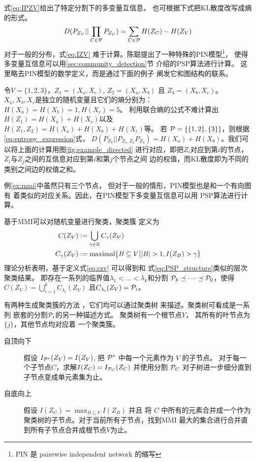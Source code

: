 式\eqref{eq:IPZV}给出了特定分割下的多变量互信息，
也可根据下式把KL散度改写成熵的形式。
\begin{equation}\label{eq:entropy_expression}
  D(P_{Z_V} || \prod_{C\in \P} P_{Z_C}) 
  = \sum_{C \in \P}
  H(Z_C) - H(Z_V)
\end{equation}
对于一般的分布，式\ref{eq:IZV}
难于计算。陈聪提出了一种特殊的PIN模型\cite{pin}\footnote{PIN 是 pairewise independent network
的缩写}，
使得多变量互信息可以用\ref{sec:community_detection}节
介绍的PSP算法进行计算。
这里略去PIN模型的数学定义，而是通过下面的例子
阐发它和图结构的联系。
\begin{example}\label{ex:mmi}
  令$V=\{1,2,3\}$，$Z_1=(X_a, X_c)$,
  $Z_2=(X_a,X_b)$ 且 $Z_3=(X_b,X_c)$。
  $X_a,X_b,X_c$是独立的随机变量且它们的熵分别为：
  $H(X_a)=H(X_b)=1, H(X_c)=5$。
  利用联合熵的公式不难计算出$H(Z_1)=H(X_a)+H(X_c)$以及
  $H(Z_1, Z_2) = H(X_a) + H(X_b) + H(X_c)$等。
  若 $\P=\{\{1,2\}, \{3\}\}$，则根据
  \eqref{eq:entropy_expression}式，
  $D(P_{Z_V}||P_{Z_1,Z_2}P_{Z_3}) = H(X_a)
  +H(X_b)$。我们可以将上面的计算用图\ref{fig:example_directed}
  进行对应，即把$Z_i$对应到第$i$的节点，
  $Z_i$与$Z_j$之间的互信息对应到第$i$和第$j$个节点之间
  边的权值，而KL散度即为不同的类别之间边的权值之和。
\end{example}
例\ref{ex:mmi}中虽然只有三个节点，
但对于一般的情形，PIN模型也是和一个有向图有
着类似的对应关系。因此，在PIN模型下多变量互信息可以用
PSP算法进行计算。

基于MMI可以对随机变量进行聚类，聚类簇
定义为
\begin{align}
  C(Z_V) &:= \bigcup_{\gamma \in \R} C_{\gamma}(Z_V)
  \label{eq:czv}\\
  C_{\gamma}(Z_V) &:= \textrm{maximal}
  \{ B \subseteq V \big\vert |B|>1, I(Z_B) > \gamma  \}
\end{align}
理论分析表明，基于定义式\ref{eq:czv} 可以得到和
式\ref{eq:PSP_structure}类似的层次聚类结果。
即存在一系列的临界值$\lambda_1 < \dots < \lambda_k$和分割
$\P_k \preceq \dots \preceq \P_0$，使得
$C(Z_V) = \bigcup_{i=1}^{k} C_{\lambda_i}(Z_V)$
且$C_{\lambda_i}(Z_V) = \P_i$。

有两种生成聚类簇的方法 \cite{chan2020agglomerative}，它们均可以通过聚类树
来描述。聚类树可看成是一系列
嵌套的分割$\P_i$的另一种描述方式。
聚类树有一个根节点$V$，
其所有的叶节点为 $\{j\}$，其他节点均对应着
一个聚类簇。

\begin{description}
  \item[自顶向下] 假设 $I_{\P^*}(Z_V)=I(Z_V)$, 
  把 $\P^*$ 中每一个元素作为 $V$ 的子节点。
  对于每一个子节点$C$，求解$I(Z_C)=I_{\P_C}(Z_C)$
  并使用分割 $\P_C$ 对子树进一步细分直到子节点变成单元素集为止。
  \item[自底向上\footnotemark] 假设 $I(Z_C) = \max_{B\subseteq V} I(Z_B)$ 并且 
  将 $C$ 中所有的元素合并成一个作为聚类树的子节点。对于当前所有子节点，找到MMI
  最大的集合进行合并直到所有子节点合并成根节点$V$为止。
  \end{description}

